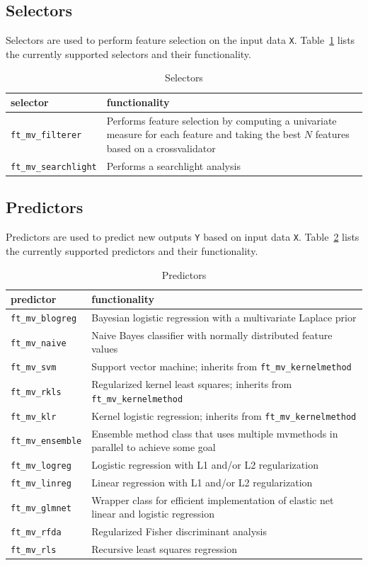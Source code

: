 \documentclass{article}
\renewcommand{\t}[1]{{\tt #1}}
\begin{document}
\subsection{Selectors}

Selectors are used to perform feature selection on the input data \t{X}. Table~\ref{selectors} lists the currently supported selectors and their functionality.

\begin{table}[ht]
\centering
\caption{Selectors}
\begin{tabular}{p{}|p{}}
\bf{selector} & \bf{functionality}\\
\hline
\t{ft\_mv\_filterer} & Performs feature selection by computing a univariate measure for each feature and taking the best $N$ features based on a crossvalidator\\
\t{ft\_mv\_searchlight} & Performs a searchlight analysis
\end{tabular}
\label{selectors}
\end{table}

\subsection{Predictors}

Predictors are used to predict new outputs \t{Y} based on input data \t{X}. Table~\ref{predictors} lists the currently supported predictors and their functionality.

\begin{table}[ht]
\centering
\caption{Predictors}
\begin{tabular}{p{}|p{}}
\bf{predictor} & \bf{functionality}\\
\hline
\t{ft\_mv\_blogreg} & Bayesian logistic regression with a multivariate Laplace prior\\
\t{ft\_mv\_naive} & Naive Bayes classifier with normally distributed feature values\\
\t{ft\_mv\_svm} & Support vector machine; inherits from \t{ft\_mv\_kernelmethod}\\
\t{ft\_mv\_rkls} & Regularized kernel least squares; inherits from \t{ft\_mv\_kernelmethod}\\
\t{ft\_mv\_klr}  &  Kernel logistic regression;  inherits from \t{ft\_mv\_kernelmethod}\\
\t{ft\_mv\_ensemble} & Ensemble method class that uses multiple mvmethods in parallel to achieve some goal\\
\t{ft\_mv\_logreg} & Logistic regression with L1 and/or L2 regularization\\
\t{ft\_mv\_linreg} & Linear regression with L1 and/or L2 regularization\\
\t{ft\_mv\_glmnet} & Wrapper class for efficient implementation of elastic net linear and logistic regression\\
\t{ft\_mv\_rfda} & Regularized Fisher discriminant analysis\\
\t{ft\_mv\_rls} & Recursive least squares regression
\end{tabular}
\label{predictors}
\end{table}
\end{document}

